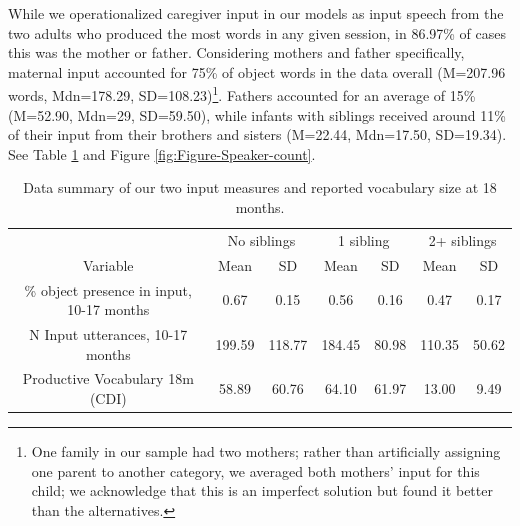 \documentclass[
  english,
  man,floatsintext]{apa6}
\begin{document}
While we operationalized caregiver input in our models as input speech from the two adults who produced the most words in any given session, in 86.97\% of cases this was the mother or father. Considering mothers and father specifically, maternal input accounted for 75\% of object words in the data overall (M=207.96 words, Mdn=178.29, SD=108.23)\footnote{One family in our sample had two mothers; rather than artificially assigning one parent to another category, we averaged both mothers' input for this child; we acknowledge that this is an imperfect solution but found it better than the alternatives.}. Fathers accounted for an average of 15\% (M=52.90, Mdn=29, SD=59.50), while infants with siblings received around 11\% of their input from their brothers and sisters (M=22.44, Mdn=17.50, SD=19.34). See Table \ref{tab:table-data-summary} and Figure \ref{fig:Figure-Speaker-count}.

\begin{table}

\caption{\label{tab:table-data-summary}Data summary of our two input measures and reported vocabulary size at 18 months.}
\centering
\begin{tabular}[t]{ccccccc}
\toprule
\multicolumn{1}{c}{ } & \multicolumn{2}{c}{No siblings} & \multicolumn{2}{c}{1 sibling} & \multicolumn{2}{c}{2+ siblings} \\
\cmidrule(l{3pt}r{3pt}){2-3} \cmidrule(l{3pt}r{3pt}){4-5} \cmidrule(l{3pt}r{3pt}){6-7}
\multicolumn{1}{c}{Variable} & \multicolumn{1}{c}{Mean} & \multicolumn{1}{c}{SD} & \multicolumn{1}{c}{Mean} & \multicolumn{1}{c}{SD} & \multicolumn{1}{c}{Mean} & \multicolumn{1}{c}{SD} \\
\cmidrule(l{3pt}r{3pt}){1-1} \cmidrule(l{3pt}r{3pt}){2-2} \cmidrule(l{3pt}r{3pt}){3-3} \cmidrule(l{3pt}r{3pt}){4-4} \cmidrule(l{3pt}r{3pt}){5-5} \cmidrule(l{3pt}r{3pt}){6-6} \cmidrule(l{3pt}r{3pt}){7-7}
\% object presence in input, 10-17 months & 0.67 & 0.15 & 0.56 & 0.16 & 0.47 & 0.17\\
N Input utterances, 10-17 months & 199.59 & 118.77 & 184.45 & 80.98 & 110.35 & 50.62\\
Productive Vocabulary 18m (CDI) & 58.89 & 60.76 & 64.10 & 61.97 & 13.00 & 9.49\\
\bottomrule
\end{tabular}
\end{table}
\end{document}
